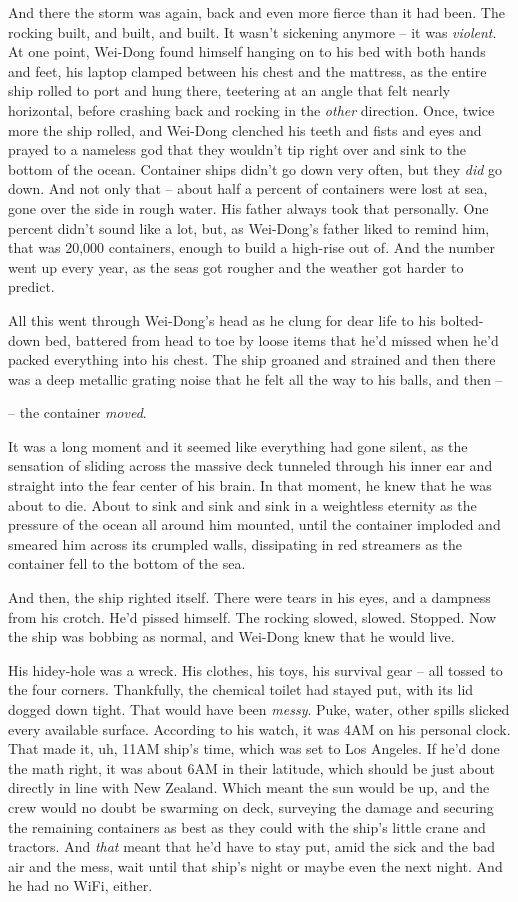 And there the storm was again, back and even more fierce than it
had been. The rocking built, and built, and built. It wasn't
sickening anymore -- it was \emph{violent}. At one point, Wei-Dong
found himself hanging on to his bed with both hands and feet, his
laptop clamped between his chest and the mattress, as the entire
ship rolled to port and hung there, teetering at an angle that felt
nearly horizontal, before crashing back and rocking in the
\emph{other} direction. Once, twice more the ship rolled, and
Wei-Dong clenched his teeth and fists and eyes and prayed to a
nameless god that they wouldn't tip right over and sink to the
bottom of the ocean. Container ships didn't go down very often, but
they \emph{did} go down. And not only that -- about half a percent
of containers were lost at sea, gone over the side in rough water.
His father always took that personally. One percent didn't sound
like a lot, but, as Wei-Dong's father liked to remind him, that was
20,000 containers, enough to build a high-rise out of. And the
number went up every year, as the seas got rougher and the weather
got harder to predict.

All this went through Wei-Dong's head as he clung for dear life to
his bolted-down bed, battered from head to toe by loose items that
he'd missed when he'd packed everything into his chest. The ship
groaned and strained and then there was a deep metallic grating
noise that he felt all the way to his balls, and then --

-- the container \emph{moved}.

It was a long moment and it seemed like everything had gone silent,
as the sensation of sliding across the massive deck tunneled
through his inner ear and straight into the fear center of his
brain. In that moment, he knew that he was about to die. About to
sink and sink and sink in a weightless eternity as the pressure of
the ocean all around him mounted, until the container imploded and
smeared him across its crumpled walls, dissipating in red streamers
as the container fell to the bottom of the sea.

And then, the ship righted itself. There were tears in his eyes,
and a dampness from his crotch. He'd pissed himself. The rocking
slowed, slowed. Stopped. Now the ship was bobbing as normal, and
Wei-Dong knew that he would live.

His hidey-hole was a wreck. His clothes, his toys, his survival
gear -- all tossed to the four corners. Thankfully, the chemical
toilet had stayed put, with its lid dogged down tight. That would
have been \emph{messy}. Puke, water, other spills slicked every
available surface. According to his watch, it was 4AM on his
personal clock. That made it, uh, 11AM ship's time, which was set
to Los Angeles. If he'd done the math right, it was about 6AM in
their latitude, which should be just about directly in line with
New Zealand. Which meant the sun would be up, and the crew would no
doubt be swarming on deck, surveying the damage and securing the
remaining containers as best as they could with the ship's little
crane and tractors. And \emph{that} meant that he'd have to stay
put, amid the sick and the bad air and the mess, wait until that
ship's night or maybe even the next night. And he had no WiFi,
either.


